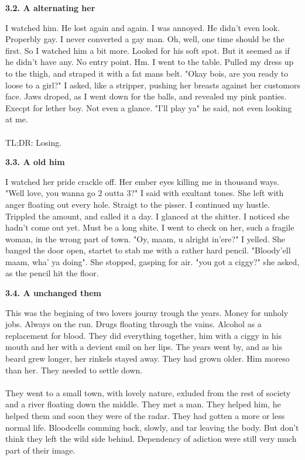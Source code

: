 \documentclass[]{article}
\begin{document}
\begin{center}
	\textbf{3.2. A alternating her}
\end{center}

I watched him. He lost again and again. I was annoyed. He didn't even look. Properbly gay. I never converted a gay man. Oh, well, one time should be the first. So I watched him a bit more. Looked for his soft spot. But it seemed as if he didn't have any. No entry point. Hm. I went to the table. Pulled my dress up to the thigh, and straped it with a fat mans belt. "Okay bois, are you ready to loose to a girl?" I asked, like a stripper, pushing her breasts against her customors face. Jaws droped, as I went down for the balls, and revealed my pink panties. Execpt for lether boy. Not even a glance. "I'll play ya" he said, not even looking at me. 
\\ \\
TL;DR: Losing.

\begin{center}
	\textbf{3.3. A old him}
\end{center}

I watched her pride crackle off. Her ember eyes killing me in thousand ways. "Well love, you wanna go 2 outta 3?" I said with exultant tones. She left with anger floating out every hole. Straigt to the pisser. I continued my hustle. Trippled the amount, and called it a day. I glanced at the shitter. I noticed she hadn't come out yet. Must be a long shite. I went to check on her, such a fragile woman, in the wrong part of town. "Oy, maam, u alright in'ere?" I yelled. She banged the door open, startet to stab me with a rather hard pencil. "Bloody'ell maam, wha' ya doing". She stopped, gasping for air. "you got a ciggy?" she asked, as the pencil hit the floor. 

\begin{center}
	\textbf{3.4. A unchanged them}
\end{center}

This was the begining of two lovers journy trough the years. Money for unholy jobs. Always on the run. Drugs floating through the vains. Alcohol as a replacement for blood. They did everything together, him with a ciggy in his mouth and her with a devient smil on her lips. The years went by, and as his beard grew longer, her rinkels stayed away. They had grown older. Him moreso than her. They needed to settle down. 
\\ \\
They went to a small town, with lovely nature, exluded from the rest of society and a river floating down the middle. They met a man. They helped him, he helped them and soon they were of the radar. They had gotten a more or less normal life. Bloodcells comming back, slowly, and tar leaving the body. But don't think they left the wild side behind. Dependency of adiction were still very much part of their image.
\end{document}
